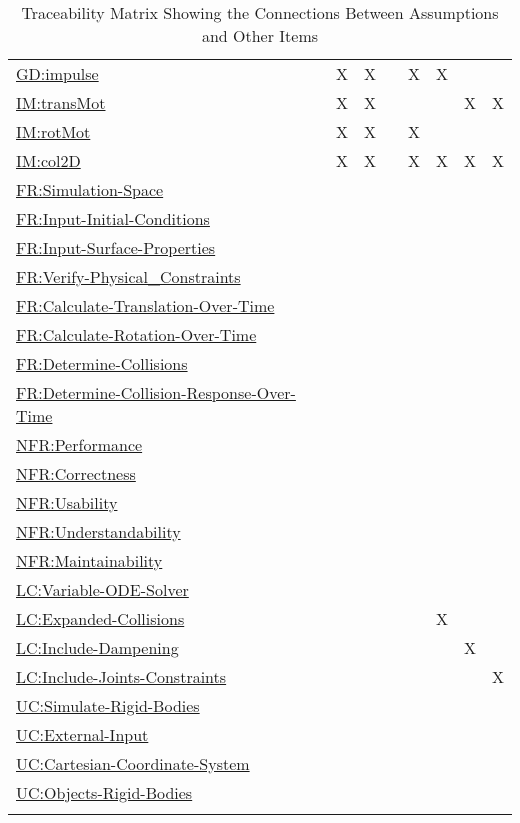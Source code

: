 \documentclass[12pt]{article}
\begin{document}
\begin{longtable}{l l l l l l l l}
\hyperref[GD:impulse]{GD:impulse} & X & X &  & X & X &  & 
\\
\hyperref[IM:transMot]{IM:transMot} & X & X &  &  &  & X & X
\\
\hyperref[IM:rotMot]{IM:rotMot} & X & X &  & X &  &  & 
\\
\hyperref[IM:col2D]{IM:col2D} & X & X &  & X & X & X & X
\\
\hyperref[simSpace]{FR:Simulation-Space} &  &  &  &  &  &  & 
\\
\hyperref[inputInitialConds]{FR:Input-Initial-Conditions} &  &  &  &  &  &  & 
\\
\hyperref[inputSurfaceProps]{FR:Input-Surface-Properties} &  &  &  &  &  &  & 
\\
\hyperref[verifyPhysCons]{FR:Verify-Physical\_Constraints} &  &  &  &  &  &  & 
\\
\hyperref[calcTransOverTime]{FR:Calculate-Translation-Over-Time} &  &  &  &  &  &  & 
\\
\hyperref[calcRotOverTime]{FR:Calculate-Rotation-Over-Time} &  &  &  &  &  &  & 
\\
\hyperref[deterColls]{FR:Determine-Collisions} &  &  &  &  &  &  & 
\\
\hyperref[deterCollRespOverTime]{FR:Determine-Collision-Response-Over-Time} &  &  &  &  &  &  & 
\\
\hyperref[performance]{NFR:Performance} &  &  &  &  &  &  & 
\\
\hyperref[correctness]{NFR:Correctness} &  &  &  &  &  &  & 
\\
\hyperref[usability]{NFR:Usability} &  &  &  &  &  &  & 
\\
\hyperref[understandability]{NFR:Understandability} &  &  &  &  &  &  & 
\\
\hyperref[maintainability]{NFR:Maintainability} &  &  &  &  &  &  & 
\\
\hyperref[lcVODES]{LC:Variable-ODE-Solver} &  &  &  &  &  &  & 
\\
\hyperref[lcEC]{LC:Expanded-Collisions} &  &  &  &  & X &  & 
\\
\hyperref[lcID]{LC:Include-Dampening} &  &  &  &  &  & X & 
\\
\hyperref[lcIJC]{LC:Include-Joints-Constraints} &  &  &  &  &  &  & X
\\
\hyperref[ucSRB]{UC:Simulate-Rigid-Bodies} &  &  &  &  &  &  & 
\\
\hyperref[ucEI]{UC:External-Input} &  &  &  &  &  &  & 
\\
\hyperref[ucCCS]{UC:Cartesian-Coordinate-System} &  &  &  &  &  &  & 
\\
\hyperref[ucORB]{UC:Objects-Rigid-Bodies} &  &  &  &  &  &  & 
\\
\bottomrule
\caption{Traceability Matrix Showing the Connections Between Assumptions and Other Items}
\label{Table:TraceMatAvsAll}
\end{longtable}
\end{document}
